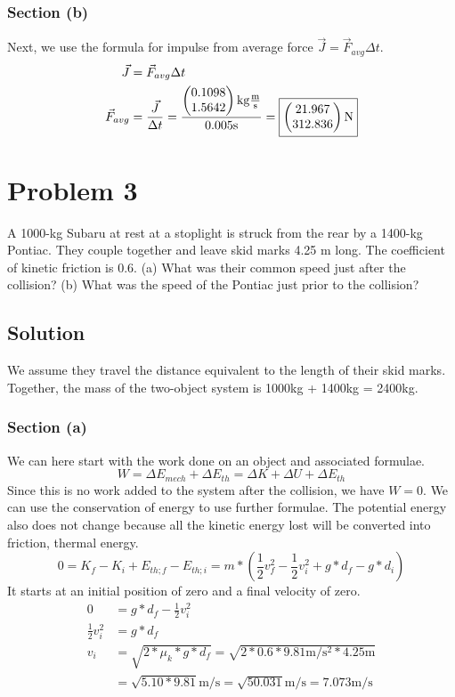 \documentclass[12pt]{article}
\begin{document}
\subsubsection*{Section (b)}
Next, we use the formula for impulse from average force $\vec{J} = \vec{F}_{avg}\Delta t$.
\begin{align*}
    \vec{J} &=  \vec{F}_{avg}\Delta t\\
    \vec{F}_{avg}   &=  \frac{\vec{J}}{\Delta t}
        =   \frac{\begin{pmatrix} 0.1098 \\ 1.5642 \end{pmatrix} \unit{\kilo\gram\frac{\meter}{\second}}}{0.005 \unit{\second}}
        =   \boxed{ \begin{pmatrix} 21.967 \\ 312.836 \end{pmatrix} \unit{\newton} }
\end{align*}


\pagebreak
\section*{Problem 3}
A 1000-kg Subaru at rest at a stoplight is struck from the rear by a 1400-kg Pontiac. They couple together and leave skid marks 4.25 m long. The coefficient of kinetic friction is 0.6. (a) What was their common speed just after the collision? (b) What was the speed of the Pontiac just prior to the collision?

\subsection*{Solution}
We assume they travel the distance equivalent to the length of their skid marks. Together, the mass of the two-object system is 1000kg + 1400kg = 2400kg. 
\subsubsection*{Section (a)}
We can here start with the work done on an object and associated formulae.
\[ W = \Delta E_{mech} + \Delta E_{th} = \Delta K + \Delta U + \Delta E_{th} \]
Since this is no work added to the system after the collision, we have $W = 0$. We can use the conservation of energy to use further formulae. The potential energy also does not change because all the kinetic energy lost will be converted into friction, thermal energy.
\[ 0 = K_f - K_i + E_{th;f} - E_{th;i} = m*\left( \frac{1}{2}v_f^2 - \frac{1}{2}v_i^2 + g*d_f - g*d_i \right) \]
It starts at an initial position of zero and a final velocity of zero.
\begin{align*}
    0   &=  g*d_f - \frac{1}{2}v_i^2\\
    \frac{1}{2}v_i^2    &=  g*d_f\\
    v_i &=  \sqrt{2*\mu_k*g*d_f}
        =   \sqrt{2*0.6*9.81\unit{\meter/\second^2}*4.25\unit{\meter}}\\
        &=  \sqrt{5.10*9.81} \unit{\meter/\second}
        =   \sqrt{50.031}\unit{\meter/\second}
        =   \boxed{7.073\unit{\meter/\second}}
\end{align*}
\pagebreak
\end{document}
